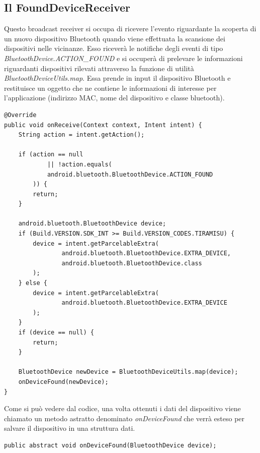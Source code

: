 \subsection{Il FoundDeviceReceiver}
Questo broadcast receiver si occupa di ricevere l'evento riguardante la scoperta di un nuovo dispositivo Bluetooth quando viene effettuata la scansione dei dispositivi nelle vicinanze. Esso riceverà le notifiche degli eventi di tipo \textit{BluetoothDevice.ACTION\_FOUND} e si occuperà di prelevare le informazioni riguardanti dispositivi rilevati attraverso la funzione di utilità \textit{BluetoothDeviceUtils.map}. Essa prende in input il dispositivo Bluetooth e restituisce un oggetto che ne contiene le informazioni di interesse per l'applicazione (indirizzo MAC, nome del dispositivo e classe bluetooth).
\begin{verbatim}
@Override
public void onReceive(Context context, Intent intent) {
    String action = intent.getAction();

    if (action == null 
            || !action.equals(
            android.bluetooth.BluetoothDevice.ACTION_FOUND
        )) {
        return;
    }
    
    android.bluetooth.BluetoothDevice device;
    if (Build.VERSION.SDK_INT >= Build.VERSION_CODES.TIRAMISU) {
        device = intent.getParcelableExtra(
                android.bluetooth.BluetoothDevice.EXTRA_DEVICE,
                android.bluetooth.BluetoothDevice.class
        );
    } else {
        device = intent.getParcelableExtra(
                android.bluetooth.BluetoothDevice.EXTRA_DEVICE
        );
    }
    if (device == null) {
        return;
    }
    
    BluetoothDevice newDevice = BluetoothDeviceUtils.map(device);
    onDeviceFound(newDevice);
}
\end{verbatim}

Come si può vedere dal codice, una volta ottenuti i dati del dispositivo viene chiamato un metodo astratto denominato \textit{onDeviceFound} che verrà esteso per salvare il dispositivo in una struttura dati.
\begin{verbatim}
public abstract void onDeviceFound(BluetoothDevice device);
\end{verbatim}


